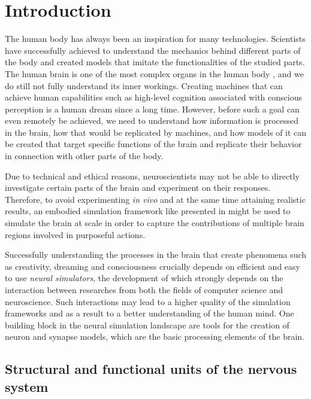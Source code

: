 \chapter{Introduction}
\label{chap:intro}

The human body has always been an inspiration for many technologies. Scientists have successfully achieved to understand the mechanics behind different parts of the body and created models that imitate the functionalities of the studied parts. The human brain is one of the most complex organs in the human body \citep{vanderah2020nolte}, and we do still not fully understand its inner workings. Creating machines that can achieve human capabilities such as high-level cognition associated with conscious perception is a human dream since a long time. However, before such a goal can even remotely be achieved, we need to understand how information is processed in the brain, how that would be replicated by machines, and how models of it can be created that target specific functions of the brain and replicate their behavior in connection with other parts of the body.

Due to technical and ethical reasons, neuroscientists may not be able to directly investigate certain parts of the brain and experiment on their responses. Therefore, to avoid experimenting \emph{in vivo} and at the same time attaining realistic results, an embodied simulation framework like presented in \citet{10.3389/fninf.2022.884180} might be used to simulate the brain at scale in order to capture the contributions of multiple brain regions involved in purposeful actions.

Successfully understanding the processes in the brain that create phenomena such as creativity, dreaming and consciousness crucially depends on efficient and easy to use \emph{neural simulators}, the development of which strongly depends on the interaction between researches from both the fields of computer science and neuroscience. Such interactions may lead to a higher quality of the simulation frameworks and as a result to a better understanding of the human mind. One building block in the neural simulation landscape are tools for the creation of neuron and synapse models, which are the basic processing elements of the brain.

\section{Structural and functional units of the nervous system}


